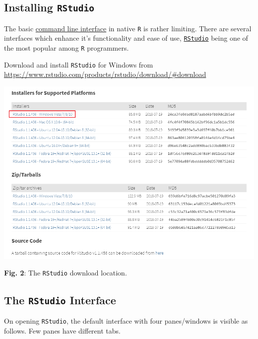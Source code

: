 \hypertarget{installing-rstudio}{%
\subsection{\texorpdfstring{Installing
\texttt{RStudio}}{Installing RStudio}}\label{installing-rstudio}}

The basic
\href{https://en.wikipedia.org/wiki/Command_line_interface}{command line
interface} in native \texttt{R} is rather limiting. There are several
interfaces which enhance it's functionality and ease of use,
\href{https://www.rstudio.com/}{\texttt{RStudio}} being one of the most
popular among \texttt{R} programmers.

Download and install \texttt{RStudio} for Windows from
\url{https://www.rstudio.com/products/rstudio/download/\#download}

\includegraphics{rstudio.png}

\begin{center}
                \textbf{Fig. 2}: The \texttt{RStudio} download location.
                \end{center}

\hypertarget{the-rstudio-interface}{%
\subsection{\texorpdfstring{The \texttt{RStudio}
Interface}{The RStudio Interface}}\label{the-rstudio-interface}}

On opening \texttt{RStudio}, the default interface with four
panes/windows is visible as follows. Few panes have different tabs.

